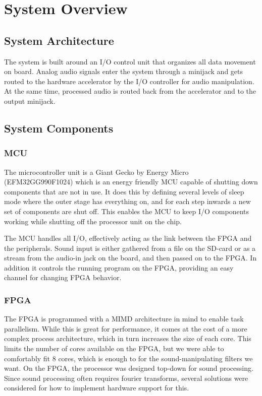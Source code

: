 \section{System Overview}
\subsection{System Architecture}


The system is built around an I/O control unit that organizes all data movement
on board. Analog audio signals enter the system through a minijack and gets
routed to the hardware accelerator by the I/O controller for audio manipulation.
At the same time, processed audio is routed back from the accelerator and to the
output minijack.

\subsection{System Components}
\subsubsection{MCU} The microcontroller unit is a Giant Gecko by Energy Micro
(EFM32GG990F1024) which is an energy friendly MCU capable of shutting down
components that are not in use. It does this by defining several levels of sleep
mode where the outer stage has everything on, and for each step inwards a new
set of components are shut off. This enables the MCU to keep I/O components working while shutting off
the processor unit on the chip.

The MCU handles all I/O, effectively acting as the link between the FPGA and the
peripherals. Sound input is either gathered from a file on the SD-card or as a
stream from the audio-in jack on the board, and then passed on to the FPGA. In
addition it controls the running program on the FPGA, providing an easy channel
for changing FPGA behavior.

\subsubsection{FPGA} The FPGA is programmed with a MIMD architecture in mind to
enable task parallelism. While this is great for performance, it comes at the
cost of a more complex process architecture, which in turn increases the size of
each core. This limits the number of cores available on the FPGA, but we were
able to comfortably fit 8 cores, which is enough to for the sound-manipulating
filters we want.
On the FPGA, the processor was designed top-down for sound processing. Since
sound processing often requires fourier transforms, several solutions were
considered for how to implement hardware support for this.

